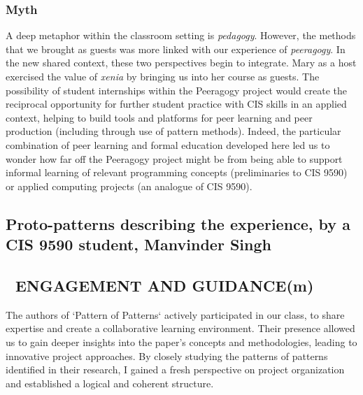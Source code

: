 \documentclass[acmlarge,timestamp]{acmart}
\newcommand{\motor}{(m)}
\begin{document}
\subsubsection{Myth}  A deep metaphor within the classroom setting is \emph{pedagogy}.  However, the methods that we brought as guests was more linked with our experience of \emph{peeragogy}.  In the new shared context, these two perspectives begin to integrate.  Mary as a host exercised the value of \emph{xenia} by bringing us into her course as guests.  The possibility of student internships within the Peeragogy project would create the reciprocal opportunity for further student practice with CIS skills in an applied context, helping to build tools and platforms for peer learning and peer production (including through use of pattern methods).  Indeed, the particular combination of peer learning and formal education developed here led us to wonder how far off the Peeragogy project might be from being able to support informal learning of relevant programming concepts (preliminaries to CIS 9590) or applied computing projects (an analogue of CIS 9590).

\subsection{Proto-patterns describing the experience, by a CIS 9590 student, Manvinder Singh}\label{sec:manny-protopatterns}


\subsection*{💎 ENGAGEMENT AND GUIDANCE{\hfill \motor}}

The authors of ‘Pattern of Patterns‘ actively participated in our
class, to share expertise and create a collaborative learning
environment. Their presence allowed us to gain deeper insights into
the paper's concepts and methodologies, leading to innovative project
approaches. By closely studying the patterns of patterns identified in
their research, I gained a fresh perspective on project organization
and established a logical and coherent structure.
\end{document}
